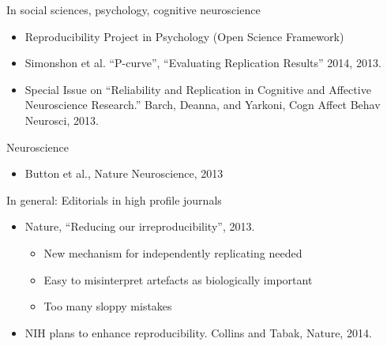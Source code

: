 \documentclass[ignorenonframetext,]{beamer}
\begin{document}
\begin{frame}

\begin{block}{In social sciences, psychology, cognitive neuroscience}

\begin{itemize}[<+->]
\itemsep1pt\parskip0pt
\item
  Reproducibility Project in Psychology (Open Science Framework)
\item
  Simonshon et al. ``P-curve'', ``Evaluating Replication Results'' 2014,
  2013.
\item
  Special Issue on ``Reliability and Replication in Cognitive and
  Affective Neuroscience Research.'' Barch, Deanna, and Yarkoni, Cogn
  Affect Behav Neurosci, 2013.
\end{itemize}

\end{block}

\begin{block}{Neuroscience}

\begin{itemize}[<+->]
\itemsep1pt\parskip0pt
\item
  Button et al., Nature Neuroscience, 2013
\end{itemize}

\end{block}

\begin{block}{In general: Editorials in high profile journals}

\begin{itemize}[<+->]
\itemsep1pt\parskip0pt
\item
  Nature, ``Reducing our irreproducibility'', 2013.

  \begin{itemize}[<+->]
  \itemsep1pt\parskip0pt
  \item
    New mechanism for independently replicating needed
  \item
    Easy to misinterpret artefacts as biologically important
  \item
    Too many sloppy mistakes
  \end{itemize}
\item
  NIH plans to enhance reproducibility. Collins and Tabak, Nature, 2014.
\end{itemize}

\end{block}

\end{frame}
\end{document}
